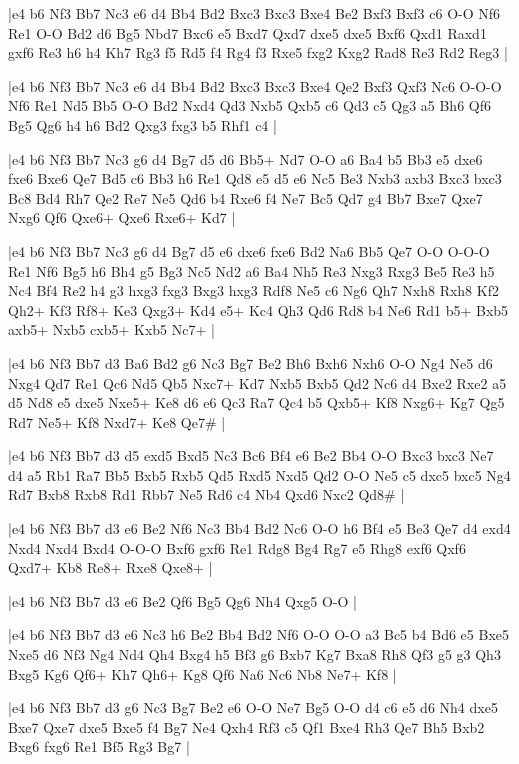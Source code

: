 \whitename{}
\blackname{}
\makegametitle
|e4 b6 Nf3 Bb7 Nc3 e6 d4 Bb4 Bd2 Bxc3 Bxc3 Bxe4 Be2 Bxf3 Bxf3 c6 O-O Nf6 Re1 O-O Bd2 d6 Bg5 Nbd7 Bxc6 e5 Bxd7 Qxd7 dxe5 dxe5 Bxf6 Qxd1 Raxd1 gxf6 Re3 h6 h4 Kh7 Rg3 f5 Rd5 f4 Rg4 f3 Rxe5 fxg2 Kxg2 Rad8 Re3 Rd2 Reg3  |

\whitename{}
\blackname{}
\makegametitle
|e4 b6 Nf3 Bb7 Nc3 e6 d4 Bb4 Bd2 Bxc3 Bxc3 Bxe4 Qe2 Bxf3 Qxf3 Nc6 O-O-O Nf6 Re1 Nd5 Bb5 O-O Bd2 Nxd4 Qd3 Nxb5 Qxb5 c6 Qd3 c5 Qg3 a5 Bh6 Qf6 Bg5 Qg6 h4 h6 Bd2 Qxg3 fxg3 b5 Rhf1 c4  |

\whitename{}
\blackname{}
\makegametitle
|e4 b6 Nf3 Bb7 Nc3 g6 d4 Bg7 d5 d6 Bb5+ Nd7 O-O a6 Ba4 b5 Bb3 e5 dxe6 fxe6 Bxe6 Qe7 Bd5 c6 Bb3 h6 Re1 Qd8 e5 d5 e6 Nc5 Be3 Nxb3 axb3 Bxc3 bxc3 Bc8 Bd4 Rh7 Qe2 Re7 Ne5 Qd6 b4 Rxe6 f4 Ne7 Bc5 Qd7 g4 Bb7 Bxe7 Qxe7 Nxg6 Qf6 Qxe6+ Qxe6 Rxe6+ Kd7  |

\whitename{}
\blackname{}
\makegametitle
|e4 b6 Nf3 Bb7 Nc3 g6 d4 Bg7 d5 e6 dxe6 fxe6 Bd2 Na6 Bb5 Qe7 O-O O-O-O Re1 Nf6 Bg5 h6 Bh4 g5 Bg3 Nc5 Nd2 a6 Ba4 Nh5 Re3 Nxg3 Rxg3 Be5 Re3 h5 Nc4 Bf4 Re2 h4 g3 hxg3 fxg3 Bxg3 hxg3 Rdf8 Ne5 c6 Ng6 Qh7 Nxh8 Rxh8 Kf2 Qh2+ Kf3 Rf8+ Ke3 Qxg3+ Kd4 e5+ Kc4 Qh3 Qd6 Rd8 b4 Ne6 Rd1 b5+ Bxb5 axb5+ Nxb5 cxb5+ Kxb5 Nc7+  |

\whitename{}
\blackname{}
\makegametitle
|e4 b6 Nf3 Bb7 d3 Ba6 Bd2 g6 Nc3 Bg7 Be2 Bh6 Bxh6 Nxh6 O-O Ng4 Ne5 d6 Nxg4 Qd7 Re1 Qc6 Nd5 Qb5 Nxc7+ Kd7 Nxb5 Bxb5 Qd2 Nc6 d4 Bxe2 Rxe2 a5 d5 Nd8 e5 dxe5 Nxe5+ Ke8 d6 e6 Qc3 Ra7 Qc4 b5 Qxb5+ Kf8 Nxg6+ Kg7 Qg5 Rd7 Ne5+ Kf8 Nxd7+ Ke8 Qe7\#  |

\whitename{}
\blackname{}
\makegametitle
|e4 b6 Nf3 Bb7 d3 d5 exd5 Bxd5 Nc3 Bc6 Bf4 e6 Be2 Bb4 O-O Bxc3 bxc3 Ne7 d4 a5 Rb1 Ra7 Bb5 Bxb5 Rxb5 Qd5 Rxd5 Nxd5 Qd2 O-O Ne5 c5 dxc5 bxc5 Ng4 Rd7 Bxb8 Rxb8 Rd1 Rbb7 Ne5 Rd6 c4 Nb4 Qxd6 Nxc2 Qd8\#  |

\whitename{}
\blackname{}
\makegametitle
|e4 b6 Nf3 Bb7 d3 e6 Be2 Nf6 Nc3 Bb4 Bd2 Nc6 O-O h6 Bf4 e5 Be3 Qe7 d4 exd4 Nxd4 Nxd4 Bxd4 O-O-O Bxf6 gxf6 Re1 Rdg8 Bg4 Rg7 e5 Rhg8 exf6 Qxf6 Qxd7+ Kb8 Re8+ Rxe8 Qxe8+  |

\whitename{}
\blackname{}
\makegametitle
|e4 b6 Nf3 Bb7 d3 e6 Be2 Qf6 Bg5 Qg6 Nh4 Qxg5 O-O  |

\whitename{}
\blackname{}
\makegametitle
|e4 b6 Nf3 Bb7 d3 e6 Nc3 h6 Be2 Bb4 Bd2 Nf6 O-O O-O a3 Bc5 b4 Bd6 e5 Bxe5 Nxe5 d6 Nf3 Ng4 Nd4 Qh4 Bxg4 h5 Bf3 g6 Bxb7 Kg7 Bxa8 Rh8 Qf3 g5 g3 Qh3 Bxg5 Kg6 Qf6+ Kh7 Qh6+ Kg8 Qf6 Na6 Nc6 Nb8 Ne7+ Kf8  |

\whitename{}
\blackname{}
\makegametitle
|e4 b6 Nf3 Bb7 d3 g6 Nc3 Bg7 Be2 e6 O-O Ne7 Bg5 O-O d4 c6 e5 d6 Nh4 dxe5 Bxe7 Qxe7 dxe5 Bxe5 f4 Bg7 Ne4 Qxh4 Rf3 c5 Qf1 Bxe4 Rh3 Qe7 Bh5 Bxb2 Bxg6 fxg6 Re1 Bf5 Rg3 Bg7  |


